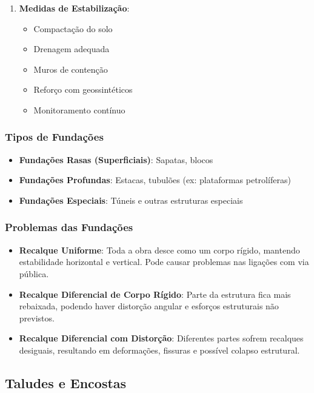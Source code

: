 \documentclass[12pt,a4paper,twoside]{book}
\begin{document}
\begin{enumerate}
    \item \textbf{Medidas de Estabilização}:
    \begin{itemize}
        \item Compactação do solo
        \item Drenagem adequada
        \item Muros de contenção
        \item Reforço com geossintéticos
        \item Monitoramento contínuo
    \end{itemize}
\end{enumerate}

\subsubsection{Tipos de Fundações}

\begin{itemize}
    \item \textbf{Fundações Rasas (Superficiais)}: Sapatas, blocos
    \item \textbf{Fundações Profundas}: Estacas, tubulões (ex: plataformas petrolíferas)
    \item \textbf{Fundações Especiais}: Túneis e outras estruturas especiais
\end{itemize}

\subsubsection{Problemas das Fundações}

\begin{itemize}
    \item \textbf{Recalque Uniforme}: Toda a obra desce como um corpo rígido, mantendo estabilidade 
    horizontal e vertical. Pode causar problemas nas ligações com via pública.
    
    \item \textbf{Recalque Diferencial de Corpo Rígido}: Parte da estrutura fica mais rebaixada, 
    podendo haver distorção angular e esforços estruturais não previstos.
    
    \item \textbf{Recalque Diferencial com Distorção}: Diferentes partes sofrem recalques desiguais, 
    resultando em deformações, fissuras e possível colapso estrutural.
\end{itemize}

\subsection{Taludes e Encostas}
\end{document}
